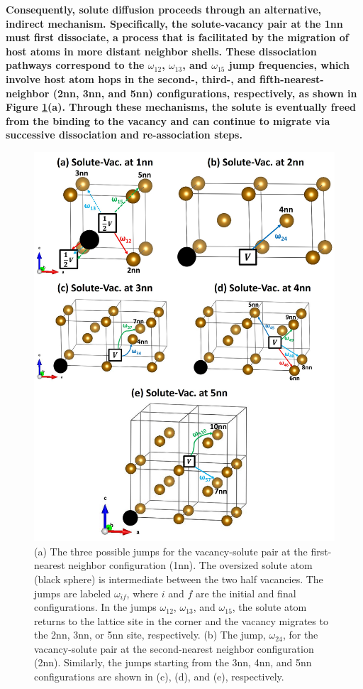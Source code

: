 \documentclass[preprint,12pt]{elsarticle}
\providecommand{\DIFaddtex}[1]{{\bf #1}} %
\providecommand{\DIFaddbegin}{\protect\color{blue}} %
\providecommand{\DIFaddend}{\protect\color{black}} %
\providecommand{\DIFdelend}{\protect\color{black}} %
\providecommand{\DIFadd}[1]{\texorpdfstring{\DIFaddtex{#1}}{#1}} %
\newcommand{\DIFaddincludegraphics}[2][]{{\color{blue}\fbox{\DIFOincludegraphics[#1]{#2}}}} %
\DeclareRobustCommand{\DIFaddbegin}{\DIFOaddbegin \let\includegraphics\DIFaddincludegraphics} %
\DeclareRobustCommand{\DIFaddend}{\DIFOaddend \let\includegraphics\DIFOincludegraphics} %
\DeclareRobustCommand{\DIFdelend}{\DIFOaddend \let\includegraphics\DIFOincludegraphics} %
\begin{document}
\DIFdelend \DIFaddbegin \DIFadd{Consequently, solute diffusion proceeds through an alternative, indirect mechanism. Specifically, the solute-vacancy pair at the 1nn must first dissociate, a process that is facilitated by the migration of host atoms in more distant neighbor shells. These dissociation pathways correspond to the $\omega_{12}$, $\omega_{13}$, and $\omega_{15}$ jump frequencies, which involve host atom hops in the second-, third-, and fifth-nearest-neighbor (2nn, 3nn, and 5nn) configurations, respectively, as shown in Figure \ref{fig:jumps}(a). Through these mechanisms, the solute is eventually freed from the binding to the vacancy and can continue to migrate via successive dissociation and re-association steps.
}\DIFaddend \begin{figure}
    \centering
    \includegraphics[width=0.7\linewidth]{jumps_all_modified_arrows.jpg}
    \caption{(a) The three possible jumps for the vacancy-solute pair at the first-nearest neighbor configuration (1nn). The oversized solute atom (black sphere) is intermediate between the two half vacancies. The jumps are labeled $\omega_{if}$, where $i$ and $f$ are the initial and final configurations. In the jumps $\omega_{12}$, $\omega_{13}$, and $\omega_{15}$, the solute atom returns to the lattice site in the corner and the vacancy migrates to the 2nn, 3nn, or 5nn site, respectively. (b) The jump, $\omega_{24}$, for the vacancy-solute pair at the second-nearest neighbor configuration (2nn). Similarly, the jumps starting from the 3nn, 4nn, and 5nn configurations are shown in (c), (d), and (e), respectively.}
    \label{fig:jumps}
\end{figure}
\end{document}
